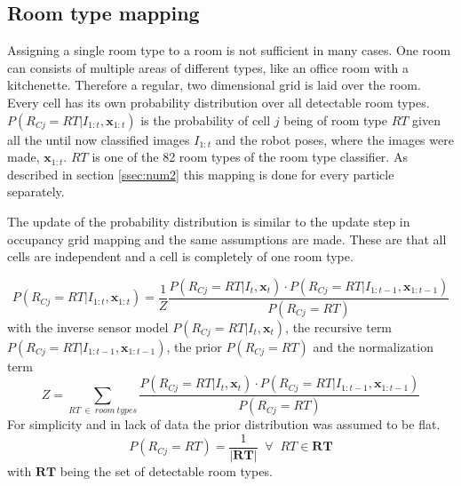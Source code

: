 \subsection{Room type mapping}

Assigning a single room type to a room is not sufficient in many cases. One room can consists of multiple areas of different types, like an office room with a kitchenette. Therefore a regular, two dimensional grid is laid over the room. Every cell has its own probability distribution over all detectable room types. $P(R_{Cj}=RT|I_{1:t},\mathbf{x}_{1:t})$ is the probability of cell $j$ being of room type $RT$ given all the until now classified images $I_{1:t}$ and the robot poses, where the images were made, $\mathbf{x}_{1:t}$. $RT$ is one of the 82 room types of the room type classifier. As described in section \ref{ssec:num2} this mapping is done for every particle separately. 

The update of the probability distribution is similar to the update step in occupancy grid mapping and the same assumptions are made. These are that all cells are independent and a cell is completely of one room type. 

\begin{equation}
 P(R_{Cj}=RT | I_{1:t}, \mathbf{x}_{1:t})=\frac1Z\frac{P(R_{Cj}=RT|I_t,\mathbf{x}_{t})\cdot P(R_{Cj}=RT | I_{1:t-1}, \mathbf{x}_{1:t-1})}{P(R_{Cj}=RT)}
\end{equation}
with the inverse sensor model $P(R_{Cj}=RT|I_t,\mathbf{x}_{t})$, the recursive term $P(R_{Cj}=RT | I_{1:t-1}, \mathbf{x}_{1:t-1})$, the prior $P(R_{Cj}=RT)$ and the normalization term
\begin{equation}
 Z=\sum_{RT\:\in \: room\: types}\frac{P(R_{Cj}=RT|I_t,\mathbf{x}_{t})\cdot P(R_{Cj}=RT | I_{1:t-1}, \mathbf{x}_{1:t-1})}{P(R_{Cj}=RT)}
\end{equation}
For simplicity and in lack of data the prior distribution was assumed to be flat.
\begin{equation}
 P(R_{Cj}=RT) = \frac{1}{|\mathbf{RT}|} \; \; \forall \; \; RT \in \mathbf{RT}
\end{equation}
with $\mathbf{RT}$ being the set of detectable room types.

